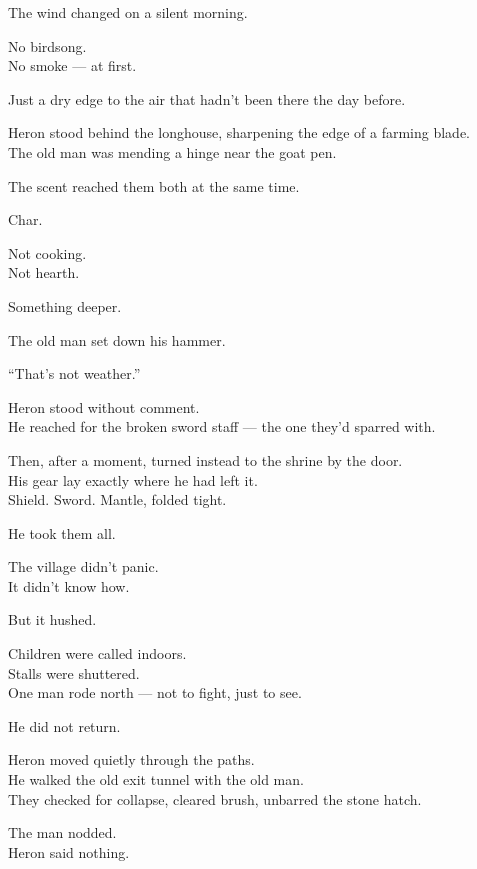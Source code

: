 \documentclass[9pt]{article}
\begin{document}
The wind changed on a silent morning.

No birdsong.\\
No smoke — at first.

Just a dry edge to the air that hadn’t been there the day before.

Heron stood behind the longhouse, sharpening the edge of a farming blade.\\
The old man was mending a hinge near the goat pen.

The scent reached them both at the same time.

Char.

Not cooking.\\
Not hearth.

Something deeper.

\vspace{1em}

The old man set down his hammer.

“That’s not weather.”

Heron stood without comment.\\
He reached for the broken sword staff — the one they’d sparred with.

Then, after a moment, turned instead to the shrine by the door.\\
His gear lay exactly where he had left it.\\
Shield. Sword. Mantle, folded tight.

He took them all.

\vspace{1em}

The village didn’t panic.\\
It didn’t know how.

But it hushed.

Children were called indoors.\\
Stalls were shuttered.\\
One man rode north — not to fight, just to see.

He did not return.

\vspace{1em}

Heron moved quietly through the paths.\\
He walked the old exit tunnel with the old man.\\
They checked for collapse, cleared brush, unbarred the stone hatch.

The man nodded.\\
Heron said nothing.
\end{document}
